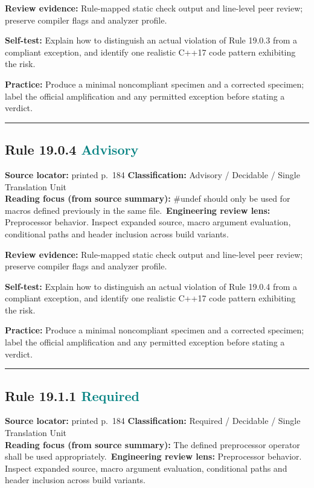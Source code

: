 \documentclass[10pt,letterpaper]{article}
\begin{document}
\textbf{Review evidence:} Rule-mapped static check output and line-level peer review; preserve compiler flags and analyzer profile.

\textbf{Self-test:} Explain how to distinguish an actual violation of Rule 19.0.3 from a compliant exception, and identify one realistic C++17 code pattern exhibiting the risk.\par
\textbf{Practice:} Produce a minimal noncompliant specimen and a corrected specimen; label the official amplification and any permitted exception before stating a verdict.
\smallskip\hrule\smallskip
\subsection*{Rule 19.0.4 \enspace \texorpdfstring{\small\textcolor{teal}{Advisory}}{Advisory}}
\noindent\textbf{Source locator:} printed p.~184 \quad\textbf{Classification:} Advisory / Decidable / Single Translation Unit\\
\textbf{Reading focus (from source summary):} \#undef should only be used for macros defined previously in the same file.\
\textbf{Engineering review lens:} Preprocessor behavior. Inspect expanded source, macro argument evaluation, conditional paths and header inclusion across build variants.

\textbf{Review evidence:} Rule-mapped static check output and line-level peer review; preserve compiler flags and analyzer profile.

\textbf{Self-test:} Explain how to distinguish an actual violation of Rule 19.0.4 from a compliant exception, and identify one realistic C++17 code pattern exhibiting the risk.\par
\textbf{Practice:} Produce a minimal noncompliant specimen and a corrected specimen; label the official amplification and any permitted exception before stating a verdict.
\smallskip\hrule\smallskip
\subsection*{Rule 19.1.1 \enspace \texorpdfstring{\small\textcolor{teal}{Required}}{Required}}
\noindent\textbf{Source locator:} printed p.~184 \quad\textbf{Classification:} Required / Decidable / Single Translation Unit\\
\textbf{Reading focus (from source summary):} The defined preprocessor operator shall be used appropriately.\
\textbf{Engineering review lens:} Preprocessor behavior. Inspect expanded source, macro argument evaluation, conditional paths and header inclusion across build variants.
\end{document}
